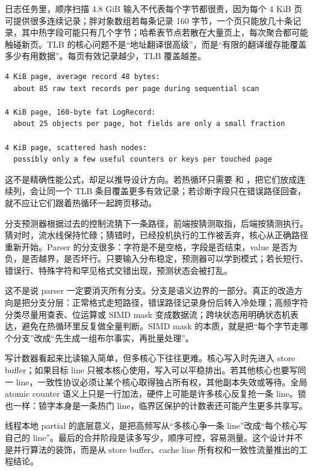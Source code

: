日志任务里，顺序扫描 4.8 GiB 输入不代表每个字节都很贵，因为每个 4 KiB 页可提供很多连续记录；胖对象数组若每条记录 160 字节，一个页只能放几十条记录，其中热字段可能只有几个字节；哈希表节点若散在大量页上，每次聚合都可能触碰新页。TLB 的核心问题不是“地址翻译很高级”，而是“有限的翻译缓存能覆盖多少有用数据”。每页有效记录越少，TLB 覆盖越差。

\begin{lstlisting}[numbers=none,caption={TLB 覆盖的直观估算}]
4 KiB page, average record 48 bytes:
  about 85 raw text records per page during sequential scan

4 KiB page, 160-byte fat LogRecord:
  about 25 objects per page, hot fields are only a small fraction

4 KiB page, scattered hash nodes:
  possibly only a few useful counters or keys per touched page
\end{lstlisting}

这不是精确性能公式，却足以推导设计方向。若热循环只需要  和 ，把它们放成连续列，会让同一个 TLB 条目覆盖更多有效记录；若诊断字段只在错误路径回查，就不应让它们跟着热循环一起跨页移动。

分支预测器根据过去的控制流猜下一条路径，前端按猜测取指，后端按猜测执行。猜对时，流水线保持忙碌；猜错时，已经投机执行的工作被丢弃，核心从正确路径重新开始。Parser 的分支很多：字符是不是空格，字段是否结束，value 是否为负，是否越界，是否坏行。只要输入分布稳定，预测器可以学到模式；若长短行、错误行、特殊字符和罕见格式交错出现，预测状态会被打乱。

这不是说 parser 一定要消灭所有分支。分支是语义边界的一部分。真正的改造方向是把分支分层：正常格式走短路径，错误路径记录身份后转入冷处理；高频字符分类尽量用查表、位运算或 SIMD mask 变成数据流；跨块状态用明确状态机表达，避免在热循环里反复做全量判断。SIMD mask 的本质，就是把“每个字节走哪个分支”改成“先生成一组布尔事实，再批量处理”。

写计数器看起来比读输入简单，但多核心下往往更难。核心写入时先进入 store buffer；如果目标 line 只被本核心使用，写入可以平稳排出。若其他核心也要写同一 line，一致性协议必须让某个核心取得独占所有权，其他副本失效或等待。全局 atomic counter 语义上只是一行加法，硬件上可能是许多核心反复抢一条 line。锁也一样：锁字本身是一条热门 line，临界区保护的计数表还可能产生更多共享写。

线程本地 partial 的底层意义，是把高频写从“多核心争一条 line”改成“每个核心写自己的 line”。最后的合并阶段是读多写少，顺序可控，容易测量。这个设计并不是并行算法的装饰，而是从 store buffer、cache line 所有权和一致性流量推出的工程结论。

